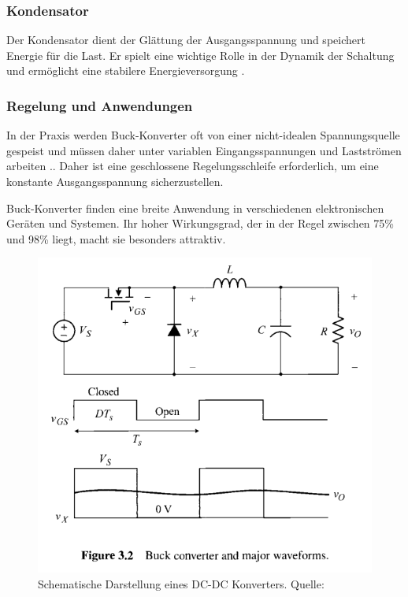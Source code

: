 \subsubsection{Kondensator}
Der Kondensator dient der Glättung der Ausgangsspannung und speichert Energie für die Last. Er spielt eine wichtige Rolle in der Dynamik der Schaltung und ermöglicht eine stabilere Energieversorgung \cite[p.~54]{Kularatna2012}.
\subsubsection{Regelung und Anwendungen}

In der Praxis werden Buck-Konverter oft von einer nicht-idealen Spannungsquelle gespeist und müssen daher unter variablen Eingangsspannungen und Lastströmen arbeiten \cite[p.~124,120,113]{choi2013pulsewidth}.. Daher ist eine geschlossene Regelungsschleife erforderlich, um eine konstante Ausgangsspannung sicherzustellen.

Buck-Konverter finden eine breite Anwendung in verschiedenen elektronischen Geräten und Systemen. Ihr hoher Wirkungsgrad, der in der Regel zwischen 75\% und 98\% liegt, macht sie besonders attraktiv.


\begin{figure}[htbp]
    \centering
    \includegraphics[width=0.4\linewidth]{2Grundlagen/111DCDC.png}
    \caption{Schematische Darstellung eines DC-DC Konverters. Quelle: \cite[Seite 88]{choi2013pulsewidth}}
    \label{fig:dcdc_converter}
\end{figure}



